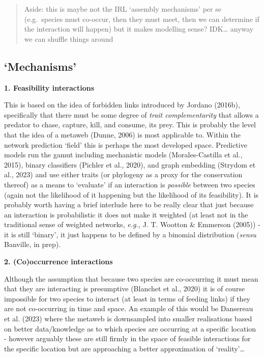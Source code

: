 \documentclass[
]{article}
\begin{document}
\begin{tcolorbox}
\begin{figure}[H]
\end{figure}%

\begin{quote}
Aside: this is maybe not the IRL `assembly mechanisms' per se
(e.g.~species must co-occur, then they must meet, then we can determine
if the interaction will happen) but it makes modelling sense?
IDK\ldots{} anyway we can shuffle things around
\end{quote}

\subsection*{`Mechanisms'}\label{mechanisms}

\textbf{1. Feasibility interactions}

This is based on the idea of forbidden links introduced by Jordano
(2016b), specifically that there must be some degree of \emph{trait
complementarity} that allows a predator to chase, capture, kill, and
consume, its prey. This is probably the level that the idea of a metaweb
(Dunne, 2006) is most applicable to. Within the network prediction
`field' this is perhaps the most developed space. Predictive models run
the gamut including mechanistic models (Morales-Castilla et al., 2015),
binary classifiers (Pichler et al., 2020), and graph embedding (Strydom
et al., 2023) and use either traits (or phylogeny as a proxy for the
conservation thereof) as a means to `evaluate' if an interaction is
\emph{possible} between two species (again not the likelihood of it
happening but the likelihood of its feasibility). It is probably worth
having a brief interlude here to be really clear that just because an
interaction is probabilistic it does not make it weighted (at least not
in the traditional sense of weighted networks, \emph{e.g.,} J. T.
Wootton \& Emmerson (2005)) - it is still `binary', it just happens to
be defined by a binomial distribution (\emph{sensu} Banville, in prep).

\textbf{2. (Co)occurrence interactions}

Although the assumption that because two species are co-occurring it
must mean that they are interacting is presumptive (Blanchet et al.,
2020) it is of course impossible for two species to interact (at least
in terms of feeding links) if they are not co-occurring in time and
space. An example of this would be Dansereau et al. (2023) where the
metaweb is downsampled into smaller realisations based on better
data/knowledge as to which species are occurring at a specific location
- however arguably these are still firmly in the space of feasible
interactions for the specific location but are approaching a better
approximation of `reality'\ldots{}


\end{tcolorbox}
\end{document}
